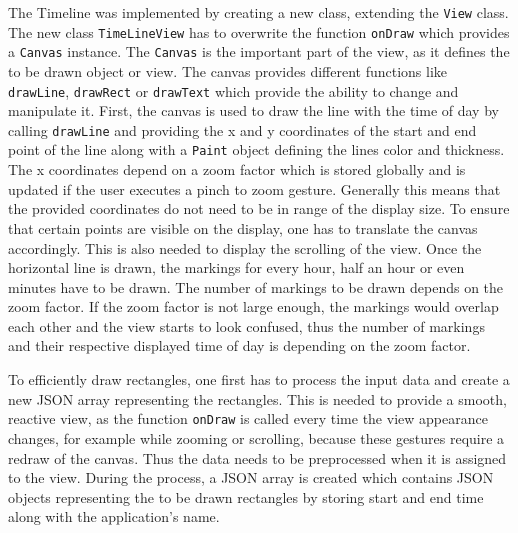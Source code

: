 The  Timeline was implemented by creating a new class, extending the \lstinline$View$ class. The new class \lstinline$TimeLineView$ has to overwrite the function \lstinline$onDraw$ which provides a \lstinline$Canvas$ instance. The \lstinline$Canvas$ is the important part of the view, as it defines the to be drawn object or view. The canvas provides different functions like \lstinline$drawLine$, \lstinline$drawRect$ or \lstinline$drawText$ which provide the ability to change and manipulate it. First, the canvas is used to draw the line with the time of day by calling \lstinline$drawLine$ and providing the x and y coordinates of the start and end point of the line along with a \lstinline$Paint$ object defining the lines color and thickness. The x coordinates depend on a zoom factor which is stored globally and is updated if the user executes a pinch to zoom gesture. Generally this means that the provided coordinates do not need to be in range of the display size. To ensure that certain points are visible on the display, one has to translate the canvas accordingly. This is also needed to display the scrolling of the view. Once the horizontal line is drawn, the markings for every hour,  half an hour or even minutes have to be drawn. The number of markings to be drawn depends on the zoom factor. If the zoom factor is not large enough, the markings would overlap each other and the view starts to look confused, thus the number of markings and their respective displayed time of day is depending on the zoom factor.

To  efficiently draw rectangles, one first has to process the input data and create a new JSON array representing the rectangles. This is needed to provide a smooth, reactive view, as the function \lstinline$onDraw$ is called every time the view appearance changes, for example while zooming or scrolling, because these gestures require a redraw of the canvas. Thus the data needs to be preprocessed when it is assigned to the view. During the process, a JSON array is created which contains JSON objects representing the to be drawn rectangles by storing start and end time along with the application's name. 

